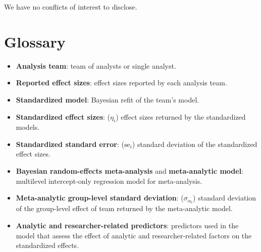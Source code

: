\documentclass[Review,times,sageh]{sagej}
\providecommand{\tightlist}{\setlength{\itemsep}{0pt}\setlength{\parskip}{0pt}}
\begin{document}
We have no conflicts of interest to disclose.

\appendix

\hypertarget{glossary}{%
\section{Glossary}\label{glossary}}

\begin{itemize}
\tightlist
\item
  \textbf{Analysis team}: team of analysts or single analyst.
\item
  \textbf{Reported effect sizes}: effect sizes reported by each analysis team.
\item
  \textbf{Standardized model}: Bayesian refit of the team's model.
\item
  \textbf{Standardized effect sizes}: (\(\eta_i\)) effect sizes returned by the standardized models.
\item
  \textbf{Standardized standard error}: (\(\text{se}_i\)) standard deviation of the standardized effect sizes.
\item
  \textbf{Bayesian random-effects meta-analysis} and \textbf{meta-analytic model}: multilevel intercept-only regression model for meta-analysis.
\item
  \textbf{Meta-analytic group-level standard deviation}: (\(\sigma_{\alpha_{\text{t}}}\)) standard deviation of the group-level effect of team returned by the meta-analytic model.
\item
  \textbf{Analytic and researcher-related predictors}: predictors used in the model that assess the effect of analytic and researcher-related factors on the standardized effects.
\end{itemize}



\end{document}
